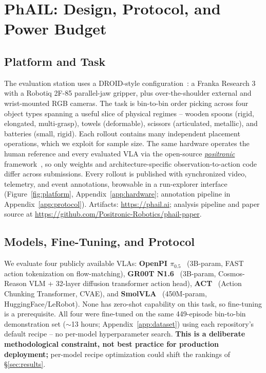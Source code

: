 \documentclass{article}
\begin{document}
\section{PhAIL: Design, Protocol, and Power Budget}\label{sec:phail}

\subsection{Platform and Task}\label{sec:phail-platform}

The evaluation station uses a DROID-style configuration~\cite{droid}: a Franka Research 3 with a Robotiq 2F-85 parallel-jaw gripper, plus over-the-shoulder external and wrist-mounted RGB cameras. The task is bin-to-bin order picking across four object types spanning a useful slice of physical regimes -- wooden spoons (rigid, elongated, multi-grasp), towels (deformable), scissors (articulated, metallic), and batteries (small, rigid). Each rollout contains many independent placement operations, which we exploit for sample size. The same hardware operates the human reference and every evaluated VLA via the open-source \href{https://github.com/Positronic-Robotics/positronic}{\emph{positronic}} framework~\cite{positronic}, so only weights and architecture-specific observation-to-action code differ across submissions. Every rollout is published with synchronized video, telemetry, and event annotations, browsable in a run-explorer interface (Figure~\ref{fig:platform}, Appendix~\ref{app:hardware}; annotation pipeline in Appendix~\ref{app:protocol}). Artifacts: \url{https://phail.ai}; analysis pipeline and paper source at \url{https://github.com/Positronic-Robotics/phail-paper}.

\subsection{Models, Fine-Tuning, and Protocol}\label{sec:phail-finetune}

We evaluate four publicly available VLAs: \textbf{OpenPI $\pi_{0.5}$}~\cite{pi05} (3B-param, FAST action tokenization on flow-matching), \textbf{GR00T N1.6}~\cite{groot_n1} (3B-param, Cosmos-Reason VLM + 32-layer diffusion transformer action head), \textbf{ACT}~\cite{act} (Action Chunking Transformer, CVAE), and \textbf{SmolVLA}~\cite{smolvla} (450M-param, HuggingFace/LeRobot). None has zero-shot capability on this task, so fine-tuning is a prerequisite. All four were fine-tuned on the same 449-episode bin-to-bin demonstration set ($\sim$13 hours; Appendix~\ref{app:dataset}) using each repository's default recipe -- no per-model hyperparameter search. \textbf{This is a deliberate methodological constraint, not best practice for production deployment;} per-model recipe optimization could shift the rankings of \S\ref{sec:results}.
\end{document}
